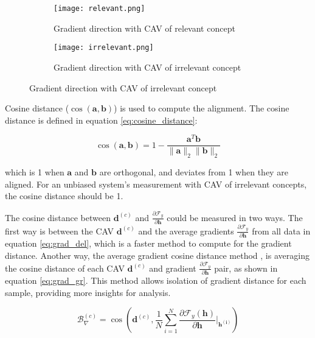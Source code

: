 \begin{figure}[H]
    \centering
    \begin{subfigure}{0.45\textwidth}
        \texttt{[image: relevant.png]}
        \caption{Gradient direction with CAV of relevant concept}
        \label{fig:relevant}
    \end{subfigure}
    \hfill
    \begin{subfigure}{0.45\textwidth}
        \texttt{[image: irrelevant.png]}
        \caption{Gradient direction with CAV of irrelevant concept}
        \label{fig:irrelevant}
    \end{subfigure}
\end{figure}

Cosine distance ($\cos(\boldsymbol{a}, \boldsymbol{b})$) is used to compute the alignment. The cosine distance is defined in equation \ref{eq:cosine_distance}:

\begin{equation} \label{eq:cosine_distance}
    \cos(\boldsymbol{a}, \boldsymbol{b}) = 1 - \frac{\boldsymbol{a}^T \boldsymbol{b}}{\|\boldsymbol{a}\|_2 \|\boldsymbol{b}\|_2}
\end{equation}

which is 1 when $\boldsymbol{a}$ and $\boldsymbol{b}$ are orthogonal, and deviates from 1 when they are aligned. For an unbiased system's measurement with CAV of irrelevant concepts, the cosine distance should be 1.

The cosine distance between $\boldsymbol{d}^{(c)}$ and $\frac{\partial \mathcal{F}_y}{\partial \boldsymbol{h}}$ could be measured in two ways. The first way is between the CAV $\boldsymbol{d}^{(c)}$ and the average gradients $\frac{\partial \mathcal{F}_y}{\partial \boldsymbol{h}}$ from all data in equation \ref{eq:grad_del}, which is a faster method to compute for the gradient distance. Another way, the average gradient cosine distance method , is averaging the cosine distance of each CAV $\boldsymbol{d}^{(c)}$ and gradient $\frac{\partial \mathcal{F}_y}{\partial \boldsymbol{h}}$ pair, as shown in equation \ref{eq:grad_gr}. This method allows isolation of gradient distance for each sample, providing more insights for analysis.

\begin{equation} \label{eq:grad_del}
    \mathcal{B}^{(c)}_{\nabla} = \cos\left(\boldsymbol{d}^{(c)}, \frac{1}{N} \sum_{i=1}^{N} \frac{\partial \mathcal{F}_y(\boldsymbol{h})}{\partial \boldsymbol{h}}\vert_{\boldsymbol{h^{(i)}}} \right)
\end{equation}

